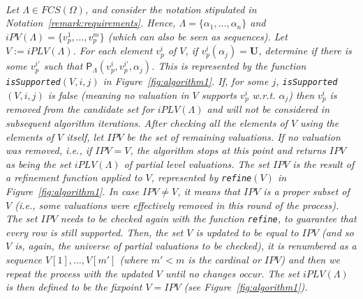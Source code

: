 \documentclass[12pt]{article}
\newcommand{\bU}{\mathbf{U}}
\begin{document}
 \\[1mm]
{\em Let $\Lambda \in FCS(\Omega)$, and consider the notation stipulated in Notation~\ref{remark:requirements}. Hence,  $\Lambda =\{\alpha_1, \ldots,\alpha_n\}$ and  $iPV(\Lambda) = \{v_p^1, \ldots, v_p^m\}$ (which can also be seen as sequences). 
Let $V:=iPLV(\Lambda)$. For each element $v_p^i$ of $V$, if $v_p^i(\alpha_j)=\bU$, determine if there is some $v_p^{i'}$ such that $\mathsf{P}_\Lambda(v_p^i,v_p^{i'},\alpha_j)$. This is represented by the function \texttt{isSupported}$(V,i,j)$ in Figure~\ref{fig:algorithm1}.
If, for some $j$, \texttt{isSupported}$(V,i,j)$ is false (meaning no valuation in $V$ supports $v_p^i$ w.r.t. $\alpha_j$) then $v_p^i$ is removed from the candidate set for 
$iPLV(\Lambda)$ and will not be considered in subsequent algorithm iterations.
After checking all the elements of $V$ using the elements of $V$ itself, let $IPV$ be the set of remaining valuations. If no valuation was removed, i.e., if $IPV=V$, the algorithm stops at this point and returns $IPV$ as being the set $iPLV(\Lambda)$ of partial level valuations. The set $IPV$ is the result of a {\em refinement} function applied to $V$, represented by \texttt{refine}$(V)$ in Figure~\ref{fig:algorithm1}. In case $IPV\neq V$, it means that $IPV$ is a proper subset of $V$ (i.e., some valuations were effectively removed in this round of the process). The set $IPV$ needs to be checked again with the function \texttt{refine}, to guarantee that every row is still supported.  Then, the set $V$ is updated to be equal to $IPV$  (and so $V$ is, again, the universe of partial valuations to be checked), it is renumbered as a sequence $V[1], \ldots, V[m']$ (where $m'<m$ is the cardinal or $IPV$) and then we repeat the process with the updated $V$ until no changes occur. The set $iPLV(\Lambda)$ is then defined to be the fixpoint $V=IPV$  (see Figure~\ref{fig:algorithm1}).}
\end{document}
